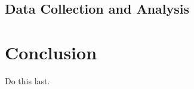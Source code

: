 \documentclass[annual]{acmsiggraph}
\begin{document}
  \subsection{Data Collection and Analysis}

\section{Conclusion}
  Do this last.



\end{document}
